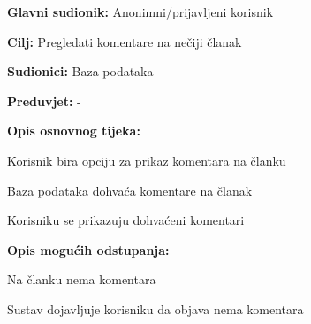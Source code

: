 \noindent {}
\begin{packed_item}

\item \textbf{Glavni sudionik:} Anonimni/prijavljeni korisnik
\item  \textbf{Cilj:} Pregledati komentare na nečiji članak
\item  \textbf{Sudionici:} Baza podataka
\item  \textbf{Preduvjet:} -
\item  \textbf{Opis osnovnog tijeka:}

\item[] \begin{packed_enum}

    \item Korisnik bira opciju za prikaz komentara na članku
    \item Baza podataka dohvaća komentare na članak
    \item Korisniku se prikazuju dohvaćeni komentari

\end{packed_enum}

\item  \textbf{Opis mogućih odstupanja:}

\item[] \begin{packed_item}

    \item[2.a] Na članku nema komentara
    \item[] \begin{packed_enum}

        \item Sustav dojavljuje korisniku da objava nema komentara

    \end{packed_enum}

\end{packed_item}
\end{packed_item}

